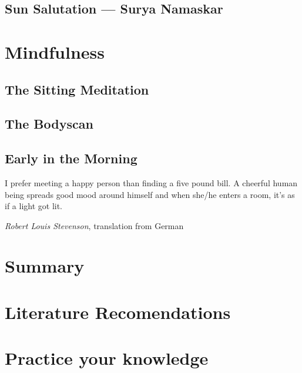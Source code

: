 \documentclass[../main.tex]{subfiles}
\begin{document}
\newpage
\section{Sun Salutation ---  Surya Namaskar}

\chapter{Mindfulness}
\section{The Sitting Meditation} %


\section{The Bodyscan}



\section{Early in the Morning}




\newpage

\epigraph{I prefer meeting a happy person than finding a five pound bill. A cheerful human being spreads good mood around himself and when she/he enters a room, it's as if a light got lit.}{\textit{Robert Louis Stevenson}, translation from German}



\chapter{Summary}

\chapter{Literature Recomendations}


\chapter{Practice your knowledge}

\end{document}
